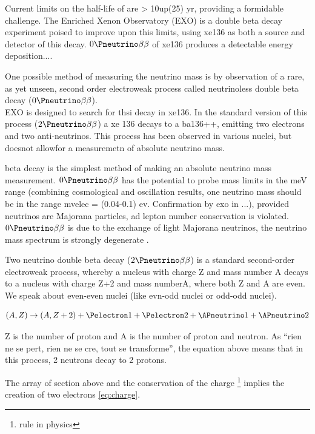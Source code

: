 \documentclass[a4paper, 11pt]{report}%
\begin{document}
  Current limits on the half-life of \OB are > 10up(25) yr, providing a 
  formidable challenge. The Enriched Xenon Observatory (EXO) is a 
  double beta decay experiment poised to improve upon this limits, using
  xe136 as both a source and detector of this decay. \(0\Pneutrino\beta\beta\) of xe136 produces a detectable
  energy deposition....
  
  One possible method of measuring the neutrino mass is by observation of a rare, 
  as yet unseen, second order electroweak process called neutrinoless double 
  beta decay (\(0\Pneutrino\beta\beta\)). \\
  EXO is designed to search for thsi decay in xe136. In the standard version
  of this process (\(2\Pneutrino\beta\beta\)) a xe 136 decays to a ba136++, emitting two electrons and two anti-neutrinos. 
  This process has been observed in various nuclei, but doesnot allowfor a measuremetn
   of absolute neutrino mass. 
   
  
 beta decay is the simplest method of making an absolute neutrino mass measurement. 
 \(0\Pneutrino\beta\beta\) has the potential to probe mass limits in the meV range (combining cosmological and oscillation
 results, one neutrino mass should be in the range mvelec = (0.04-0.1) ev. Confirmation by 
 exo in ...), provided neutrinos are Majorana particles, ad lepton number
 conservation is violated. 
 \(0\Pneutrino\beta\beta\) is  due to the exchange of light Majorana neutrinos, the neutrino mass
 spectrum is strongly degenerate . 
 
 
 Two neutrino double beta decay (\(2\Pneutrino\beta\beta\)) is a standard second-order electroweak
 process, whereby a nucleus with charge Z and mass number A decays to a nucleus
 with charge Z+2 and mass numberA, where both Z and A are even. We speak about even-even nuclei (like evn-odd nuclei or odd-odd nuclei). 
 
 \begin{equation} \label{eq:charge}
    (A,Z) \rightarrow (A,Z+2) + \Pelectron1 + \Pelectron2 + \APneutrino1 + \APneutrino2
 \end{equation}
 
 Z is the number of proton and A is the number of proton and neutron. As ``rien ne se pert, rien ne se cre, tout se transforme'', 
 the equation above means that in this process, 2 neutrons decay to 2 protons. 
 
 The array of section above and the conservation of the charge \footnote{rule in physics} 
 implies the creation of two electrons \ref{eq:charge}. \\
 
\end{document}
